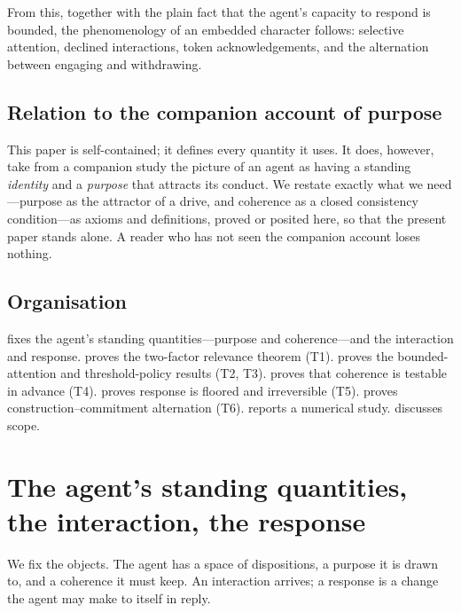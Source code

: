 \documentclass[11pt,twocolumn,a4paper]{article}
\begin{document}
From this, together with the plain fact that the agent's capacity to
respond is bounded, the phenomenology of an embedded character follows:
selective attention, declined interactions, token acknowledgements, and
the alternation between engaging and withdrawing.

\subsection{Relation to the companion account of purpose}

This paper is self-contained; it defines every quantity it uses. It does,
however, take from a companion study the picture of an agent as having a
standing \emph{identity} and a \emph{purpose} that attracts its conduct.
We restate exactly what we need---purpose as the attractor of a drive, and
coherence as a closed consistency condition---as 
axioms and definitions, proved or posited here, so that the present paper
stands alone. A reader who has not seen the companion account loses
nothing.

\subsection{Organisation}

 fixes the agent's standing quantities---purpose and
coherence---and the interaction and response.  proves
the two-factor relevance theorem (T1).  proves the
bounded-attention and threshold-policy results (T2, T3).
 proves that coherence is testable in advance (T4).
 proves response is floored and irreversible (T5).
 proves construction--commitment alternation (T6).
 reports a numerical study. 
discusses scope.

\section{The agent's standing quantities, the interaction, the response}
\label{sec:standing}

We fix the objects. The agent has a space of dispositions, a purpose it is
drawn to, and a coherence it must keep. An interaction arrives; a response
is a change the agent may make to itself in reply.
\end{document}
